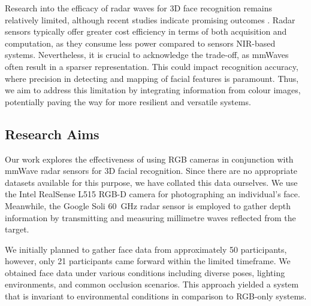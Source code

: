 \documentclass{mpaper}
\begin{document}
Research into the efficacy of radar waves for 3D face recognition remains relatively limited, although recent studies indicate promising outcomes \cite{hof2020face, lim2020dnn,kim2020face, pho2021radar, challa2021face}. Radar sensors typically offer greater cost efficiency in terms of both acquisition and computation, as they consume less power compared to sensors NIR-based systems. Nevertheless, it is crucial to acknowledge the trade-off, as mmWaves often result in a sparser representation. This could impact recognition accuracy, where precision in detecting and mapping of facial features is paramount. Thus, we aim to address this limitation by integrating information from colour images, potentially paving the way for more resilient and versatile systems.


\subsection{Research Aims}
Our work explores the effectiveness of using RGB cameras in conjunction with mmWave radar sensors for 3D facial recognition. Since there are no appropriate datasets available for this purpose, we have collated this data ourselves. We use the Intel RealSense L515 RGB-D camera \cite{intel-l515} for photographing an individual's face. Meanwhile, the Google Soli \qty{60}{\GHz} radar sensor \cite{lien2016soli} is employed to gather depth information by transmitting and measuring millimetre waves reflected from the target.

We initially planned to gather face data from approximately \num{50} participants, however, only \num{21} participants came forward within the limited timeframe. We obtained face data under various conditions including diverse poses, lighting environments, and common occlusion scenarios. This approach yielded a system that is invariant to environmental conditions in comparison to RGB-only systems.
\end{document}
